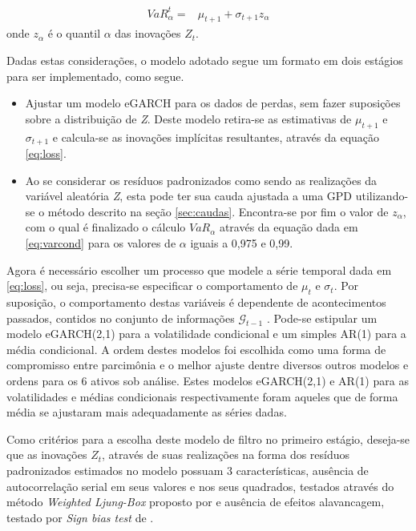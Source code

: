 \documentclass[review]{elsarticle}
\theoremstyle{definition}
\begin{document}
\begin{align}
\label{eq:varcond} 
VaR_\alpha^t=&\mu_{t+1}+\sigma_{t+1}z_\alpha 
\end{align}
onde $z_\alpha$ é o quantil $\alpha$ das inovações $Z_t$.

Dadas estas considerações, o modelo adotado segue um formato em dois estágios para ser implementado, como segue.
\begin{itemize}
	\item Ajustar um modelo eGARCH para os dados de perdas, sem fazer suposições sobre a distribuição de \emph{Z}. Deste modelo retira-se as estimativas de $\mu_{t+1}$ e $\sigma_{t+1}$ e calcula-se as inovações implícitas resultantes, através da equação \eqref{eq:loss}.
	\item Ao se considerar os resíduos padronizados como sendo as realizações da variável aleatória \emph{Z}, esta pode ter sua cauda ajustada a uma GPD utilizando-se o método descrito na seção \ref{sec:caudas}. Encontra-se por fim o valor de $z_\alpha$, com o qual é finalizado o cálculo $VaR_\alpha$ através da equação dada em \eqref{eq:varcond} para os valores de $\alpha$ iguais a 0,975 e 0,99.
\end{itemize}

Agora é necessário escolher um processo que modele a série temporal dada em \eqref{eq:loss}, ou seja, precisa-se especificar o comportamento de $\mu_t$ e $\sigma_t$. Por suposição, o comportamento destas variáveis é dependente de acontecimentos passados, contidos no conjunto de informações $\mathcal{G}_{t-1}$ . Pode-se estipular um modelo eGARCH(2,1) para a volatilidade condicional e um simples AR(1) para a média condicional. A ordem destes modelos foi escolhida como uma forma de compromisso entre parcimônia e o melhor ajuste dentre diversos outros modelos e ordens para os 6 ativos sob análise. Estes modelos eGARCH(2,1) e AR(1) para as volatilidades e médias condicionais respectivamente foram aqueles que de forma média se ajustaram mais adequadamente as séries dadas.

Como critérios para a escolha deste modelo de filtro no primeiro estágio, deseja-se que as inovações $Z_t$, através de suas realizações na forma dos resíduos padronizados estimados no modelo possuam 3 características, ausência de autocorrelação serial em seus valores e nos seus quadrados, testados através do método \emph{Weighted Ljung-Box} proposto por \cite{Fisher2012} e ausência de efeitos alavancagem, testado por \emph{Sign bias test} de \cite{Engle1993}.
\end{document}
